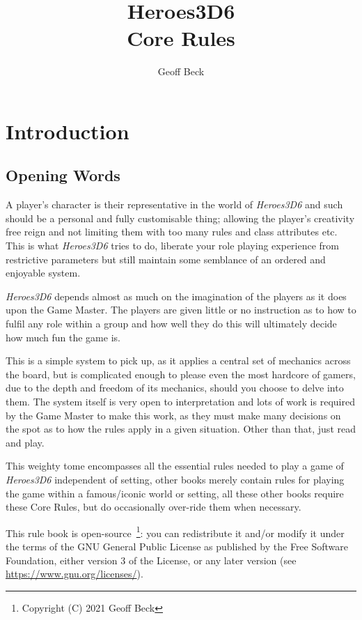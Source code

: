\documentclass[a4paper,10pt,oneside]{book}
\title{\textbf{\huge Heroes3D6\\Core Rules}}
\author{Geoff Beck}
\date{}
\begin{document}
\maketitle
\frontmatter
\tableofcontents
\mainmatter

\chapter{Introduction}

\section{Opening Words}
A player's character is their representative in the world of \textit{Heroes3D6} and such should be a personal and fully customisable thing; allowing the player's creativity free reign and not limiting them with too many rules and class attributes etc. This is what \textit{Heroes3D6} tries to do, liberate your role playing experience from restrictive parameters but still maintain some semblance of an ordered and enjoyable system.

\textit{Heroes3D6} depends almost as much on the imagination of the players as it does upon the Game Master. The players are given little or no instruction as to how to fulfil any role within a group and how well they do this will ultimately decide how much fun the game is.

This is a simple system to pick up, as it applies a central set of mechanics across the board, but is complicated enough to please even the most hardcore of gamers, due to the depth and freedom of its mechanics, should you choose to delve into them. The system itself is very open to interpretation and lots of work is required by the Game Master to make this work, as they must make many decisions on the spot as to how the rules apply in a given situation. Other than that, just read and play.

This weighty tome encompasses all the essential rules needed to play a game of \textit{Heroes3D6} independent of setting, other books merely contain rules for playing the game within a famous/iconic world or setting, all these other books require these Core Rules, but do occasionally over-ride them when necessary.

This rule book is open-source~\footnote{Copyright (C) 2021  Geoff Beck}: you can redistribute it and/or modify
it under the terms of the GNU General Public License as published by
the Free Software Foundation, either version 3 of the License, or any later version (see \url{https://www.gnu.org/licenses/}).
\end{document}
